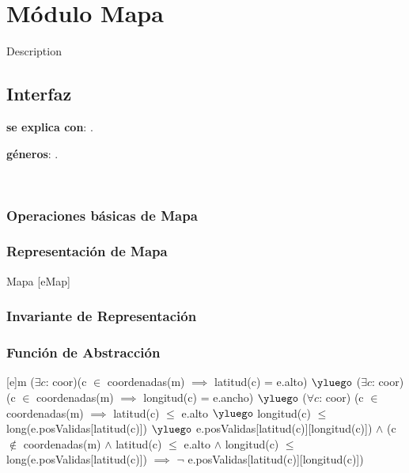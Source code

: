 \section{Módulo Mapa}

Description %

\subsection{Interfaz}

	\textbf{se explica con}: .

	\textbf{géneros}: .

~

\subsubsection{Operaciones básicas de Mapa}



\subsubsection{Representación de Mapa}

\begin{Estructura}{ Mapa }[eMap]
	\begin{Tupla}[eMap]
	\end{Tupla}
\end{Estructura}

\subsubsection{Invariante de Representación}



\subsubsection{Función de Abstracción}

[e]{m}
{
	($\exists c$: coor)(c $\in$ coordenadas(m) $\implies$ latitud(c) = e.alto) $\yluego$
	($\exists c$: coor)(c $\in$ coordenadas(m) $\implies$ longitud(c) = e.ancho) $\yluego$
	($\forall c$: coor)
		(c $\in$ coordenadas(m) $\implies$ 
			latitud(c) $\leq$ e.alto $\yluego$
			longitud(c) $\leq$ long(e.posValidas[latitud(c)]) $\yluego$ 
			e.posValidas[latitud(c)][longitud(c)]) $\land$
		(c $\not\in$ coordenadas(m) $\land$ latitud(c) $\leq$ e.alto $\land$ longitud(c) $\leq$ long(e.posValidas[latitud(c)]) $\implies$ $\neg$ e.posValidas[latitud(c)][longitud(c)])
}
